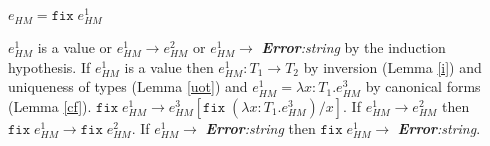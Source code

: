 \begin{case}
$e_{HM}=\mathtt{fix}\;e_{HM}^{1}$

$e_{HM}^{1}$ is a value or $e_{HM}^{1}\rightarrow e_{HM}^{2}$ or $e_{HM}^{1}\rightarrow$ \emph{\textbf{Error}:\;string} by the induction hypothesis.  If $e_{HM}^{1}$ is a value then $e_{HM}^{1}:T_{1}\rightarrow T_{2}$ by inversion (Lemma \ref{i}) and uniqueness of types (Lemma \ref{uot}) and $e_{HM}^{1}=\lambda x:T_{1}.e_{HM}^{3}$ by canonical forms (Lemma \ref{cf}).  $\mathtt{fix}\;e_{HM}^{1}\rightarrow e_{HM}^{3}[\mathtt{fix}\;(\lambda x:T_{1}.e_{HM}^{3})/x]$.  If $e_{HM}^{1}\rightarrow e_{HM}^{2}$ then $\mathtt{fix}\;e_{HM}^{1}\rightarrow\mathtt{fix}\;e_{HM}^{2}$.  If $e_{HM}^{1}\rightarrow$ \emph{\textbf{Error}:\;string} then $\mathtt{fix}\;e_{HM}^{1}\rightarrow$ \emph{\textbf{Error}:\;string}.
\end{case}